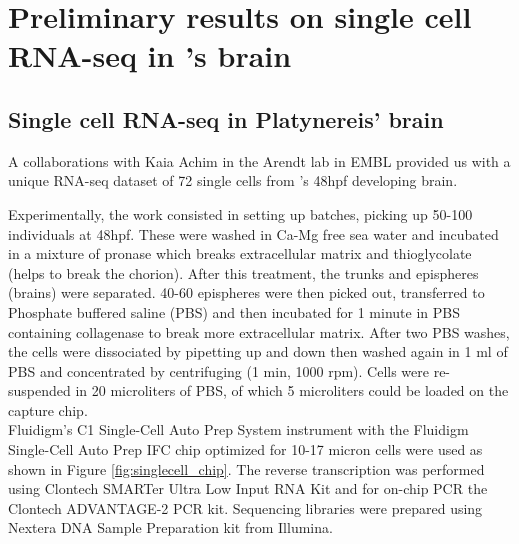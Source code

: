 \section{Preliminary results on single cell RNA-seq in \platy{}'s brain}\label{sec:back_mapping_platy}
  \subsection{Single cell RNA-seq in Platynereis' brain}
  
    	A collaborations with Kaia Achim in the Arendt lab in EMBL provided us with a unique RNA-seq dataset of 72 single cells from \platy{}'s 48hpf developing brain. 
    	
	Experimentally, the work consisted in setting up \platy{} batches, picking up 50-100 individuals at 48hpf. These were washed in Ca-Mg free sea water and incubated in a mixture of pronase which breaks extracellular matrix and thioglycolate (helps to break the chorion). After this treatment, the trunks and epispheres (brains) were separated. 40-60 epispheres were then picked out, transferred to Phosphate buffered saline (PBS) and then incubated for 1 minute in PBS containing collagenase to break more extracellular matrix. After two PBS washes, the cells were dissociated by pipetting up and down then washed again in 1 ml of PBS and concentrated by centrifuging (1 min, 1000 rpm). Cells were re-suspended in 20 microliters of PBS, of which 5 microliters could be loaded on the capture chip.\\

	Fluidigm's C1 Single-Cell Auto Prep System instrument with the Fluidigm Single-Cell Auto Prep IFC chip optimized for 10-17 micron cells were used as shown in Figure \ref{fig:singlecell_chip}. The reverse transcription was performed using Clontech SMARTer Ultra Low Input RNA Kit and for on-chip PCR the Clontech ADVANTAGE-2 PCR kit. Sequencing libraries were prepared using Nextera DNA Sample Preparation kit from Illumina.\\
	
